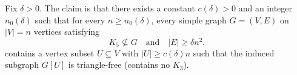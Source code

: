 Fix $\delta>0$. The claim is that there exists a constant $c(\delta)>0$ and an integer $n_0(\delta)$ such that for every $n\ge n_0(\delta)$, every simple graph $G=(V,E)$ on $|V|=n$ vertices satisfying
\[
K_5\nsubseteq G\quad\text{and}\quad |E|\ge \delta n^2,
\]
contains a vertex subset $U\subseteq V$ with $|U|\ge c(\delta)n$ such that the induced subgraph $G[U]$ is triangle-free (contains no $K_3$).
